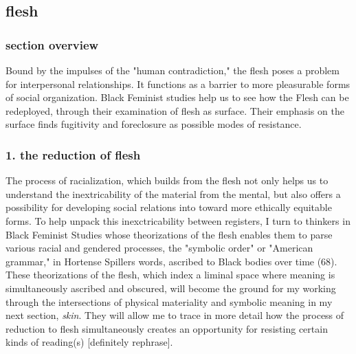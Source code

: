 \documentclass[11pt]{article}
\begin{document}
\subsection{flesh}
\label{sec:orgbfbf778}
\subsubsection{section overview}
\label{sec:org8685594}
Bound by the impulses of the "human contradiction," the flesh poses a
problem for interpersonal relationships. It functions as a barrier to
more pleasurable forms of social organization. Black Feminist studies
help us to see how the Flesh can be redeployed, through their
examination of flesh as surface. Their emphasis on the surface finds
fugitivity and foreclosure as possible modes of resistance.

\subsubsection{1. the reduction of flesh}
\label{sec:orgc79175c}
The process of racialization, which builds from the flesh not only
helps us to understand the inextricability of the material from the
mental, but also offers a possibility for developing social relations
into toward more ethically equitable forms. To help unpack this
inexctricability between registers, I turn to thinkers in Black
Feminist Studies whose theorizations of the flesh enables them to
parse various racial and gendered processes, the "symbolic order" or
"American grammar," in Hortense Spillers words, ascribed to Black
bodies over time (68). These theorizations of the flesh, which index a
liminal space where meaning is simultaneously ascribed and obscured,
will become the ground for my working through the intersections of
physical materiality and symbolic meaning in my next section,
\emph{skin}. They will allow me to trace in more detail how the process of
reduction to flesh simultaneously creates an opportunity for resisting
certain kinds of reading(s) [definitely rephrase].
\end{document}
